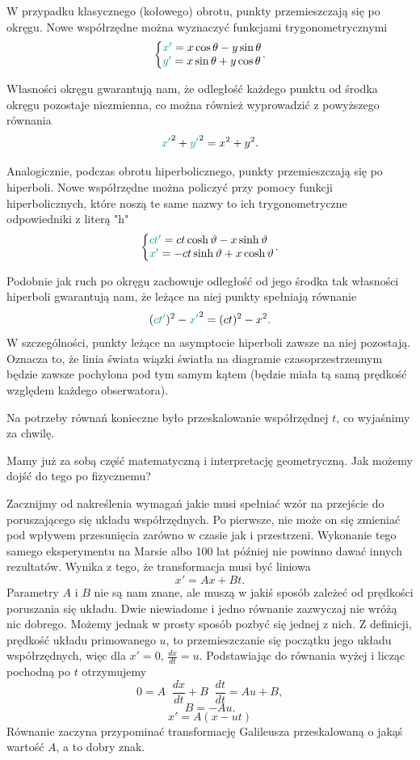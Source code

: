 \documentclass[10pt,twocolumn,fleqn,polish]{article}
\makeatletter
\providecommand{\mathcolor}[2]{{\color{#1}#2}}
\newcommand{\mgreen}[1]{\mathcolor{Green}{#1}}
\newcommand{\derivative}[2][]{\mathop{}\!\frac{{d}#1}{{d}#2}}
\newenvironment{eqsystem}
  {\left\lbrace
    \begin{array}{@{}l@{}}}
  {\end{array}\right.}
\makeatother
\begin{document}
W przypadku klasycznego (kołowego) obrotu, punkty przemieszczają się po okręgu.
Nowe współrzędne można wyznaczyć funkcjami trygonometrycznymi
\[
  \begin{eqsystem}
    \mathcolor{Green}{x'} = x \cos\theta - y\sin\theta \\
    \mathcolor{Green}{y'} = x \sin\theta + y\cos\theta
  \end{eqsystem}.
\]

Własności okręgu gwarantują nam, że odległość każdego punktu od środka okręgu pozostaje
niezmienna, co można również wyprowadzić z powyższego równania
\[{\mathcolor{Green}{x'}}^2 + {\mathcolor{Green}{y'}}^2 = x^2 + y^2.\]

Analogicznie, podczas obrotu hiperbolicznego\footnotemark, punkty
przemieszczają się po hiperboli.
Nowe współrzędne można policzyć przy pomocy funkcji hiperbolicznych, które
noszą te same nazwy to ich trygonometryczne odpowiedniki z literą "h"
\[
  \begin{eqsystem}
    \mathcolor{Green}{ct'} = ct \cosh\vartheta - x \sinh\vartheta \\
    \mathcolor{Green}{x'} = -ct \sinh\vartheta + x \cosh\vartheta
  \end{eqsystem}.
\]

Podobnie jak ruch po okręgu zachowuje odległość od jego środka tak własności hiperboli
gwarantują nam, że leżące na niej punkty spełniają równanie
\[(\mgreen{ct'})^2 - {\mgreen{x'}}^2 = (ct)^2 - x^2.\]
W szczególności, punkty leżące na asymptocie hiperboli zawsze na niej pozostają.
Oznacza to, że linia świata wiązki światła na diagramie czasoprzestrzennym będzie
zawsze pochylona pod tym samym kątem
(będzie miała tą samą prędkość względem każdego obserwatora).

Na potrzeby równań konieczne było przeskalowanie współrzędnej $t$, co wyjaśnimy za chwilę.


Mamy już za sobą część matematyczną i interpretację geometryczną.
Jak możemy dojść do tego po fizycznemu?

Zacznijmy od nakreślenia wymagań jakie musi spełniać wzór na przejście do
poruszającego się układu współrzędnych.
Po pierwsze, nie może on się zmieniać pod wpływem przesunięcia zarówno w czasie jak
i przestrzeni. Wykonanie tego samego eksperymentu na Marsie albo 100 lat później
nie powinno dawać innych rezultatów. Wynika z tego, że transformacja musi być liniowa\footnotemark
\[x'= Ax + Bt.\]
Parametry $A$ i $B$ nie są nam znane, ale muszą w jakiś sposób zależeć od prędkości
poruszania się układu. Dwie niewiadome i jedno równanie zazwyczaj nie wróżą nic dobrego.
Możemy jednak w prosty sposób pozbyć się jednej z nich.
Z definicji, prędkość układu primowanego $u$, to przemieszczanie się początku jego
układu współrzędnych, więc dla $x' = 0$, $\frac{dx}{dt} = u$.
Podstawiając do równania wyżej i licząc pochodną po $t$ otrzymujemy
\[0 = A \derivative[x]{t} + B \derivative[t]{t} = Au + B,\]
\[B = -Au.\]
\[x' = A(x - ut)\]
Równanie zaczyna przypominać transformację Galileusza przeskalowaną
o jakąś wartość $A$, a to dobry znak.
\end{document}
